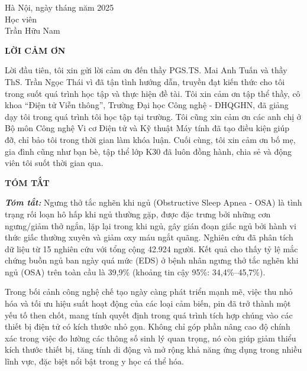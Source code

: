 \begin{flushright}
	\begin{varwidth}{\linewidth}\centering
		Hà Nội, ngày \space\space\space\space tháng  \space\space\space\space năm 2025\\
		Học viên\\[2cm]
		Trần Hữu Nam
	\end{varwidth}
\end{flushright}

\newpage

\begin{center}
    \textbf{LỜI CẢM ƠN}
\end{center}

Lời đầu tiên, tôi xin gửi lời cảm ơn đến thầy PGS.TS. Mai Anh Tuấn và thầy ThS. Trần Ngọc Thái vì đã tận tình hướng dẫn, truyền đạt kiến thức cho tôi trong suốt quá trình học tập và thực hiện đề tài. 
Tôi xin cảm ơn tập thể thầy, cô khoa “Điện tử Viễn thông”,  Trường Đại học Công nghệ - ĐHQGHN, đã giảng dạy tôi trong quá trình tôi học tập tại trường. Tôi cũng xin cảm ơn các anh chị ở Bộ môn Công nghệ Vi cơ Điện tử và Kỹ thuật Máy tính đã tạo điều kiện giúp đỡ, chỉ bảo tôi trong thời gian làm khóa luận. 
Cuối cùng, tôi xin cảm ơn bố mẹ, gia đình cũng như bạn bè, tập thể lớp K30 đã luôn đồng hành, chia sẻ và động viên tôi suốt thời gian qua.


\newpage
{}
\begin{center}
    \textbf{TÓM TẮT}
\end{center}
\textit{\textbf{Tóm tắt: }} 
Ngưng thở tắc nghẽn khi ngủ (Obstructive Sleep Apnea - OSA) là tình trạng rối loạn hô hấp khi ngủ thường gặp, được đặc trưng bởi những cơn ngưng/giảm thở ngắn, lặp lại trong khi ngủ, gây gián đoạn giấc ngủ bởi hành vi thức giấc thường xuyên và giảm oxy máu ngắt quãng\cite{Epstein2009}. Nghiên cứu\cite{Salari2025} đã phân tích dữ liệu từ 15 nghiên cứu với tổng cộng 42.924 người. Kết quả cho thấy tỷ lệ mắc chứng buồn ngủ ban ngày quá mức (EDS) ở bệnh nhân ngưng thở tắc nghẽn khi ngủ (OSA) trên toàn cầu là 39,9\% (khoảng tin cậy 95\%: 34,4\%–45,7\%).

Trong bối cảnh công nghệ chế tạo ngày càng phát triển mạnh mẽ, việc thu nhỏ hóa và tối ưu hiệu suất hoạt động của các loại cảm biến, pin đã trở thành một yếu tố then chốt, mang tính quyết định trong quá trình tích hợp chúng vào các thiết bị điện tử có kích thước nhỏ gọn. Không chỉ góp phần nâng cao độ chính xác trong việc đo lường các thông số sinh lý quan trọng, nó còn giúp giảm thiểu kích thước thiết bị, tăng tính di động và mở rộng khả năng ứng dụng trong nhiều lĩnh vực, đặc biệt nổi bật trong y học cá thể hóa.

